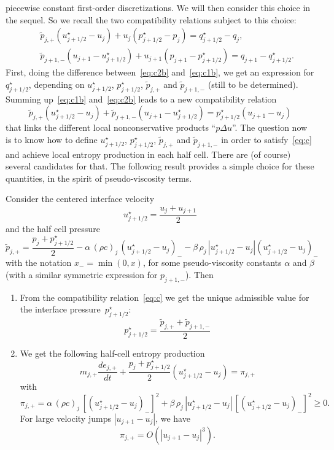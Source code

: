 \documentclass[graybox]{svmult}
\newcommand{\pjp}{\tilde p_{j,+}}
\newcommand{\pjjm}{\tilde p_{j+1,-}}
\newcommand{\ps}{p_{j+1/2}^\star}
\newcommand{\us}{u_{j+1/2}^\star}
\newcommand{\qs}{q_{j+1/2}^\star}
\newcommand{\ejp}{e_{j,+}}
\newcommand{\mjp}{m_{j,+}}
\begin{document}
piecewise constant first-order discretizations. We will then consider this choice
in the sequel. So we recall the two compatibility relations subject to this choice:
%
\begin{eqnarray}
&& \pjp \left(\us - u_j \right) + u_j\left(\ps - p_j\right) = \qs - q_j, 
\label{eq:c1b}\\
&& \tilde p_{j+1,-} \left(u_{j+1}-\us\right) + u_{j+1}\left(p_{j+1}-\ps \right)= q_{j+1} - \qs.
\label{eq:c2b}
\end{eqnarray}
%
First, doing the difference between~\eqref{eq:c2b} and~\eqref{eq:c1b}, we get
an expression for $\qs$, depending on $\us$, $\ps$, $\pjp$ and $\pjjm$
(still to be determined).
Summing up~\eqref{eq:c1b} and~\eqref{eq:c2b} leads to a new compatibility relation
%
\begin{equation}
\boxed{
\pjp\left(\us - u_j\right)+\pjjm\left(u_{j+1}-\us\right) = \ps\left(u_{j+1}-u_j\right)}
\label{eq:c}
\end{equation}
%
that links the different local nonconservative products ``$p\Delta u$''. The question now
is to know how to define $\us$, $\ps$, $\pjp$ and $\pjjm$ in order to satisfy~\eqref{eq:c}
and achieve local entropy production in each half cell. There are (of course)
several candidates for that. The following result provides a simple choice for these
quantities, in the spirit of pseudo-viscosity terms.
%
\begin{theorem}\label{thm:1}
Consider the centered interface velocity 
%
\begin{equation}
\us = \frac{u_j+u_{j+1}}{2}
\label{eq:us}
\end{equation}
%
and the half cell pressure
%
\small
\begin{equation}
\pjp = \frac{p_j+\ps}{2} - \alpha\, (\rho c)_j\, \left(\us-u_j\right)_-
- \beta\, \rho_j\, |\us-u_j|\left(\us-u_j\right)_-
\label{eq:pjp}
\end{equation}
\normalsize
%
with the notation $x_-=\min(0,x)$, for some pseudo-viscosity constants $\alpha$ and $\beta$
(with a similar symmetric expression for $p_{j+1,-}$). Then
%
\begin{enumerate}
\item From the compatibility relation~\eqref{eq:c} we get the unique admissible value for 
the interface pressure~$\ps$:
%
\begin{equation}
\ps = \frac{\pjp+\pjjm}{2}
\label{eq:ps}
\end{equation}
%
\item We get the following half-cell entropy production
%
\begin{equation}
\mjp \frac{d\ejp}{dt} + \frac{p_j+\ps}{2}(\us-u_j) = \pi_{j,+}
\label{eq:tds}
\end{equation}
%
with
%
\small
\begin{equation}
\pi_{j,+} = \alpha\, (\rho c)_j\, [(\us-u_j)_-]^2 
+ \beta\, \rho_j \,|\us-u_j|\, [(\us-u_j)_-]^2 \geq 0.
\label{eq:pijp}
\end{equation}
\normalsize
%
For large velocity jumps $|u_{j+1}-u_j|$, we have
\[
\pi_{j,+} = O(|u_{j+1}-u_j|^3).
\]
%
\end{enumerate}
\end{theorem}
\end{document}
